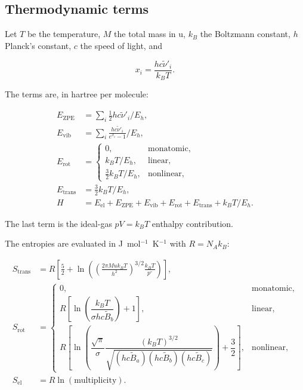 \subsection{Thermodynamic terms}\label{sec:thermo-terms}

Let $T$ be the temperature, $M$ the total mass in u, $k_B$ the Boltzmann
constant, $h$ Planck's constant, $c$ the speed of light, and

\begin{equation}
x_i = \frac{h c \tilde{\nu}'_i}{k_B T}.
\end{equation}

The terms are, in hartree per molecule:

\begin{align}
E_{\mathrm{ZPE}} &= \sum_i \tfrac{1}{2} h c \tilde{\nu}'_i / E_h, \\
E_{\mathrm{vib}} &= \sum_i \frac{h c \tilde{\nu}'_i}{e^{x_i}-1} / E_h, \\
E_{\mathrm{rot}} &=
  \begin{cases}
    0, & \text{monatomic},\\
    k_B T / E_h, & \text{linear},\\
    \tfrac{3}{2} k_B T / E_h, & \text{nonlinear},
  \end{cases}\\
E_{\mathrm{trans}} &= \tfrac{3}{2} k_B T / E_h, \\
H &= E_{\mathrm{el}} + E_{\mathrm{ZPE}} + E_{\mathrm{vib}}
     + E_{\mathrm{rot}} + E_{\mathrm{trans}} + k_B T / E_h .
\end{align}

The last term is the ideal-gas $pV = k_B T$ enthalpy contribution.

The entropies are evaluated in J~mol$^{-1}$~K$^{-1}$ with
$R = N_A k_B$:

\begin{align}
S_{\mathrm{trans}} &= R\left[\frac{5}{2}
  + \ln\!\left(\left(\frac{2\pi M u k_B T}{h^2}\right)^{3/2}
  \frac{k_B T}{p^\circ}\right)\right], \\
S_{\mathrm{rot}} &=
  \begin{cases}
    0, & \text{monatomic},\\
    R\left[\ln\!\left(\dfrac{k_B T}{\sigma h c \tilde{B}_b}\right)+1\right],
      & \text{linear},\\
    R\left[\ln\!\left(\dfrac{\sqrt{\pi}}{\sigma}
      \dfrac{(k_B T)^{3/2}}
           {\sqrt{(h c \tilde{B}_a)(h c \tilde{B}_b)(h c \tilde{B}_c)}}\right)
      +\dfrac{3}{2}\right], & \text{nonlinear},
  \end{cases} \\
S_{\mathrm{el}} &= R \ln(\text{multiplicity}).
\end{align}

